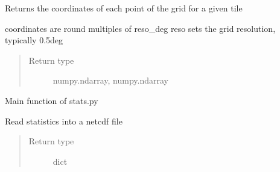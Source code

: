 \documentclass[letterpaper,10pt,english]{sphinxmanual}
\begin{document}

\begin{fulllineitems}
\label{\detokenize{pargopy:pargopy.stats.grid_coordinate}}
Returns the coordinates of each point of the grid for a given tile

coordinates are round multiples of reso\_deg
reso sets the grid resolution, typically 0.5deg
\begin{quote}\begin{description}
\item[{Return type}] \leavevmode
numpy.ndarray, numpy.ndarray

\end{description}\end{quote}

\end{fulllineitems}


\begin{fulllineitems}
\label{\detokenize{pargopy:pargopy.stats.main}}
Main function of stats.py

\end{fulllineitems}


\begin{fulllineitems}
\label{\detokenize{pargopy:pargopy.stats.read_stat_file}}
Read statistics into a netcdf file
\begin{quote}\begin{description}
\item[{Return type}] \leavevmode
dict

\end{description}\end{quote}

\end{fulllineitems}
\end{document}
